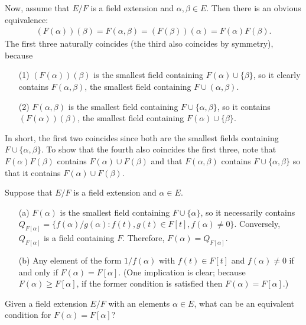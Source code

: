 \begin{obs}
    Now, assume that $E/F$ is a field extension and $\alpha, \beta\in E$.
    Then there is an obvious equivalence:
    \begin{align*}
        (F(\alpha))(\beta)=F(\alpha, \beta)=(F(\beta))(\alpha)=F(\alpha)F(\beta).
    \end{align*}
    The first three naturally coincides (the third also coincides by symmetry), because
    \begin{enumerate}
        \item[(1)]
        {
            $(F(\alpha))(\beta)$ is the smallest field containing $F(\alpha)\cup\{\beta\}$, so it clearly contains $F(\alpha, \beta)$, the smallest field containing $F\cup(\alpha, \beta)$.
        }
        \item[(2)]
        {
            $F(\alpha, \beta)$ is the smallest field containing $F\cup\{\alpha, \beta\}$, so it contains $(F(\alpha))(\beta)$, the smallest field containing $F(\alpha)\cup\{\beta\}$.
        }
    \end{enumerate}
    In short, the first two coincides since both are the smallest fields containing $F\cup\{\alpha, \beta\}$.
    To show that the fourth also coincides the first three, note that $F(\alpha)F(\beta)$ contains $F(\alpha)\cup F(\beta)$ and that $F(\alpha, \beta)$ contains $F\cup\{\alpha, \beta\}$ so that it contains $F(\alpha)\cup F(\beta)$.
\end{obs}

\begin{obs}
    Suppose that $E/F$ is a field extension and $\alpha\in E$.
    \begin{enumerate}
        \item[(a)]
        {
            $F(\alpha)$ is the smallest field containing $F\cup\{\alpha\}$, so it necessarily contains $Q_{F[\alpha]}=\{f(\alpha)/g(\alpha): f(t), g(t)\in F[t], f(\alpha)\neq 0\}$.
            Conversely, $Q_{F[\alpha]}$ is a field containing $F$.
            Therefore, $F(\alpha)=Q_{F[\alpha]}$.
        }
        \item[(b)]
        {
            Any element of the form $1/f(\alpha)$ with $f(t)\in F[t]$ and $f(\alpha)\neq 0$ if and only if $F(\alpha)=F[\alpha]$.
            (One implication is clear; because $F(\alpha)\geq F[\alpha]$, if the former condition is satisfied then $F(\alpha)=F[\alpha]$.)
        }
    \end{enumerate}
\end{obs}
\begin{qst}\label{qst: rationalizability}
    Given a field extension $E/F$ with an elements $\alpha\in E$, what can be an equivalent condition for $F(\alpha)=F[\alpha]$?
\end{qst}

